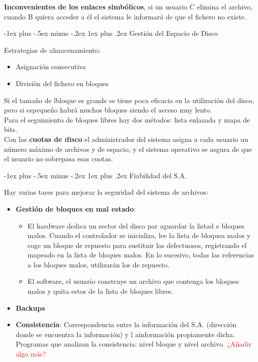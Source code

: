\documentclass[10pt,portrait, twocolumn]{article}
\makeatletter
\renewcommand{\subsubsection}{\@startsection{subsubsection}{3}{0mm}%
                                {-1ex plus -.5ex minus -.2ex}%
                                {1ex plus .2ex}%
                                {\normalfont\small\bfseries}}
\makeatother
\begin{document}
	\quad \textbf{Inconvenientes de los enlaces simbólicos}, si un usuario C elimina el archivo, cuando B quiera acceder a él el sistema le informará de que el fichero no existe.
	
\subsubsection{Gestión del Espacio de Disco}

Estrategias de almacenamiento:

	\begin{itemize}
		\item Asignación consecutiva
		\item División del fichero en bloques
	\end{itemize}
	
Si el tamaño de lbloque es grande se tiene poca eficacia en la utilización del disco, pero si espequeño habrá muchos bloques siendo el acceso muy lento.\\

Para el seguimiento de bloques libres hay dos métodos: lista enlazada y mapa de bits.\\

Con las \textbf{cuotas de disco} el administrador del sistema asigna a cada usuario un número máximo de archivos y de espacio, y el sistema operativo se asgura de que el usuario no sobrepasa esas cuotas.

\subsubsection{Fiabilidad del S.A.}

Hay varias tares para mejorar la seguridad del sistema de archivos:

	\begin{itemize}
		\item \textbf{Gestión de bloques en mal estado}:
			\begin{itemize}
				\item El hardware dedica un sector del disco par aguardar la listad e bloques malos. Cuando el controlador se inicializa, lee la lista de bloquea malos y coge un bloque de repuesto para sustituir los defectuosos, registrando el mapeado en la lista de bloques malos. En lo sucesivo, todas las referencias a los bloques malos, utilizarán los de repuesto.
				\item El software, el usuario construye un archivo que contenga los bloques malos y quita estos de la lista de bloques libres.
			\end{itemize}
			
		\item 	\textbf{Backups}
		\item \textbf{Consistencia}: Correspondencia entre la información del S.A. (dirección donde se encuentra la información) y l ainformación propiamente dicha. Programas que analizan la consistencia: nivel bloque y nivel archivo. \textcolor{red}{¿Añadir algo más?}
	\end{itemize}
	
\end{document}
